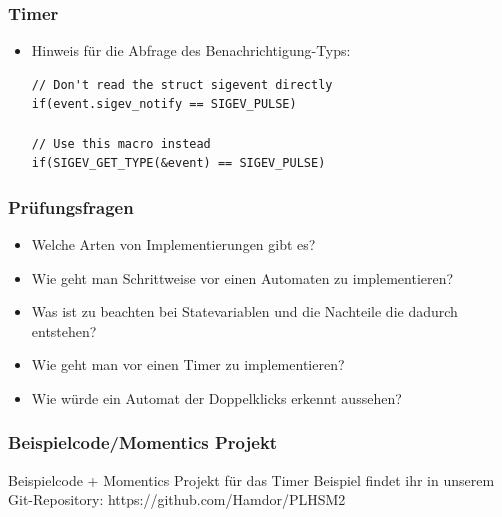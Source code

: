 \documentclass{beamer}
\begin{document}
\begin{frame}[fragile]
 \frametitle{Timer}
 \begin{itemize}
  \item Hinweis f\"ur die Abfrage des Benachrichtigung-Typs:\newline
  \begin{lstlisting}
// Don't read the struct sigevent directly
if(event.sigev_notify == SIGEV_PULSE)

// Use this macro instead
if(SIGEV_GET_TYPE(&event) == SIGEV_PULSE)
  \end{lstlisting}
 \end{itemize}
\end{frame}

\begin{frame}
 \frametitle{Pr\"ufungsfragen}
 \begin{itemize}
  \item Welche Arten von Implementierungen gibt es?
  \item Wie geht man Schrittweise vor einen Automaten zu implementieren?
  \item Was ist zu beachten bei Statevariablen und die Nachteile die dadurch entstehen?
  \item Wie geht man vor einen Timer zu implementieren?
  \item Wie würde ein Automat der Doppelklicks erkennt aussehen?
 \end{itemize}
\end{frame}

\begin{frame}
 \frametitle{Beispielcode/Momentics Projekt}
 Beispielcode + Momentics Projekt f\"ur das Timer Beispiel findet ihr in unserem Git-Repository:
 https://github.com/Hamdor/PLHSM2
\end{frame}
\end{document}

